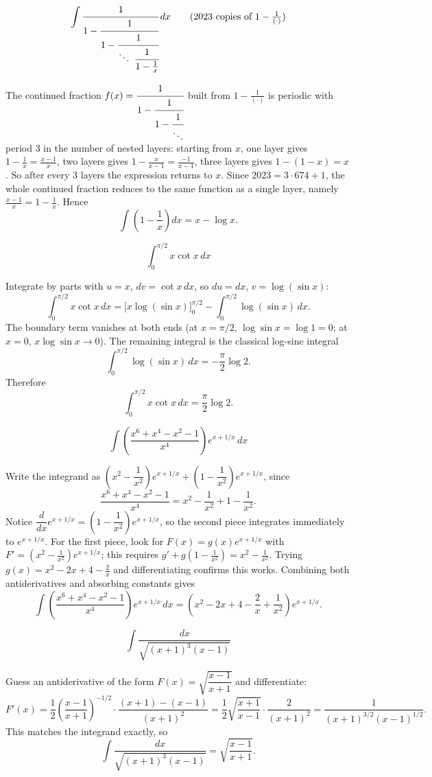 \begin{questions}
\question \[\int \cfrac{1}{1-\cfrac{1}{1-\cfrac{1}{\ddots\ \cfrac{1}{1-\frac1x}}}}\,dx\qquad(\text{2023 copies of }1-\tfrac1{(\cdot)})\]
\begin{solution}
The continued fraction $f(x)=\cfrac1{1-\cfrac1{1-\cfrac1{\ddots}}}$ built from $1-\tfrac1{(\cdot)}$ is periodic with period $3$ in the number of nested layers: starting from $x$, one layer gives $1-\tfrac1x=\tfrac{x-1}{x}$, two layers gives $1-\tfrac{x}{x-1}=\tfrac{-1}{x-1}$, three layers gives $1-(1-x)=x$. So after every $3$ layers the expression returns to $x$. Since $2023=3\cdot674+1$, the whole continued fraction reduces to the same function as a single layer, namely $\tfrac{x-1}{x}=1-\tfrac1x$. Hence
\[\int\left(1-\frac1x\right)dx=x-\log x.\]
\end{solution}

\question \[\int_0^{\pi/2} x\cot x\,dx\]
\begin{solution}
Integrate by parts with $u=x$, $dv=\cot x\,dx$, so $du=dx$, $v=\log(\sin x)$:
\[\int_0^{\pi/2}x\cot x\,dx=\Big[x\log(\sin x)\Big]_0^{\pi/2}-\int_0^{\pi/2}\log(\sin x)\,dx.\]
The boundary term vanishes at both ends (at $x=\pi/2$, $\log\sin x=\log1=0$; at $x=0$, $x\log\sin x\to0$). The remaining integral is the classical log-sine integral
\[\int_0^{\pi/2}\log(\sin x)\,dx=-\frac{\pi}{2}\log2.\]
Therefore
\[\int_0^{\pi/2}x\cot x\,dx=\frac{\pi}{2}\log2.\]
\end{solution}

\question \[\int \left(\frac{x^6+x^4-x^2-1}{x^4}\right)e^{x+1/x}\,dx\]
\begin{solution}
Write the integrand as $\left(x^2-\dfrac1{x^2}\right)e^{x+1/x}+\left(1-\dfrac1{x^2}\right)e^{x+1/x}$, since
\[\frac{x^6+x^4-x^2-1}{x^4}=x^2-\frac1{x^2}+1-\frac1{x^2}.\]
Notice $\dfrac{d}{dx}e^{x+1/x}=\left(1-\dfrac1{x^2}\right)e^{x+1/x}$, so the second piece integrates immediately to $e^{x+1/x}$. For the first piece, look for $F(x)=g(x)e^{x+1/x}$ with $F'=\left(x^2-\tfrac1{x^2}\right)e^{x+1/x}$; this requires $g'+g\left(1-\tfrac1{x^2}\right)=x^2-\tfrac1{x^2}$. Trying $g(x)=x^2-2x+4-\tfrac{2}{x}$ and differentiating confirms this works. Combining both antiderivatives and absorbing constants gives
\[\int \left(\frac{x^6+x^4-x^2-1}{x^4}\right)e^{x+1/x}\,dx=\left(x^2-2x+4-\frac2x+\frac1{x^2}\right)e^{x+1/x}.\]
\end{solution}

\question \[\int \frac{dx}{\sqrt{(x+1)^3(x-1)}}\]
\begin{solution}
Guess an antiderivative of the form $F(x)=\sqrt{\dfrac{x-1}{x+1}}$ and differentiate:
\[F'(x)=\frac{1}{2}\left(\frac{x-1}{x+1}\right)^{-1/2}\cdot\frac{(x+1)-(x-1)}{(x+1)^2}=\frac{1}{2}\sqrt{\frac{x+1}{x-1}}\cdot\frac{2}{(x+1)^2}=\frac{1}{(x+1)^{3/2}(x-1)^{1/2}}.\]
This matches the integrand exactly, so
\[\int \frac{dx}{\sqrt{(x+1)^3(x-1)}}=\sqrt{\frac{x-1}{x+1}}.\]
\end{solution}


\end{questions}
